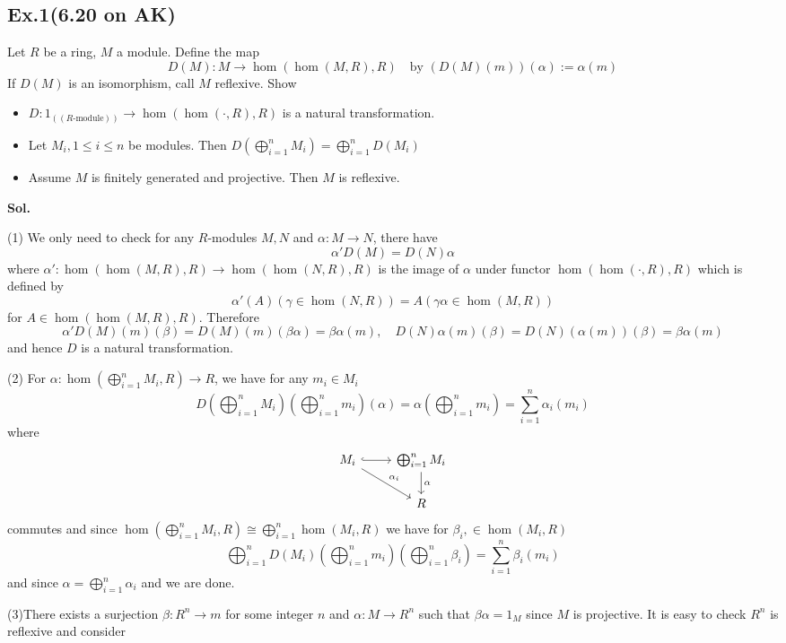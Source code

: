 \documentclass[lang=en,11pt,a4paper,citestyle =authoryear]{elegantpaper}
\begin{document}
\subsection*{Ex.1(6.20 on AK)} 
Let $R$ be a ring, $M$ a module. Define the map
\[D(M): M \to \hom(\hom(M,R),R)\quad\text{by }(D(M)(m))(\alpha):=\alpha(m)\]
If $D(M)$ is an isomorphism, call $M$ reflexive. Show
\begin{itemize}
    \item $D:1_{((R\text{-module}))} \to \hom(\hom(\cdot,R),R)$ is a natural transformation.
    \item Let $M_i, 1\leq i\leq n$ be modules. Then $D(\bigoplus_{i=1}^n M_i) = \bigoplus_{i=1}^n D(M_i)$
    \item Assume $M$ is finitely generated and projective. Then $M$ is reflexive.
\end{itemize}
\vspace{0.5em}
\textbf{Sol.} \par
    (1) We only need to check for any $R$-modules $M,N$ and $\alpha:M\to N$, there have
    \[
    \alpha'D(M) = D(N)\alpha
    \]
    where $\alpha':\hom(\hom(M,R),R)\to\hom(\hom(N,R),R) $ is the image of $\alpha$ under functor $\hom(\hom(\cdot,R),R)$ which is defined by
    \[\alpha'(A)(\gamma \in \hom(N,R)) = A(\gamma\alpha\in \hom(M,R))\]
    for $A\in \hom(\hom(M,R),R)$. Therefore
    \[
    \alpha' D(M)(m)(\beta) =  D(M)(m)(\beta\alpha) = \beta\alpha(m),\quad D(N)\alpha(m)(\beta) = D(N)(\alpha(m))(\beta) = \beta\alpha(m) 
    \]
    and hence $D$ is a natural transformation.\par
    (2) For $\alpha: \hom(\bigoplus_{i=1}^n M_i,R) \to R$, we have for any $m_i \in M_i$
    \[D(\bigoplus_{i=1}^n M_i)(\bigoplus_{i=1}^n m_i)(\alpha) = \alpha(\bigoplus_{i=1}^n m_i) = \sum\limits_{i=1}^n \alpha_i (m_i)\]
    where
    \[
    \begin{tikzcd}
        M_i\arrow[rd,"\alpha_i"]\arrow[hookrightarrow]{r} & \bigoplus_{i=1}^n M_i\arrow[d,"\alpha"] \\
            & R
    \end{tikzcd}
    \]
    commutes and since $\hom(\bigoplus_{i=1}^n M_i, R) \cong \bigoplus_{i=1}^n \hom(M_i,R)$ we have for $\beta_i,\in \hom(M_i,R)$
    \[
    \bigoplus_{i=1}^n D(M_i)(\bigoplus_{i=1}^n m_i)(\bigoplus_{i=1}^n \beta_i) = \sum\limits_{i=1}^n \beta_i(m_i)
    \]
    and since $\alpha = \bigoplus_{i=1}^n \alpha_i$ and we are done.\par
    (3)There exists a surjection $\beta: R^n \to m$ for some integer $n$ and $\alpha:M\to R^n$ such that $\beta\alpha = 1_M$ since $M$ is projective. It is easy to check $R^n$ is reflexive and consider
\end{document}
